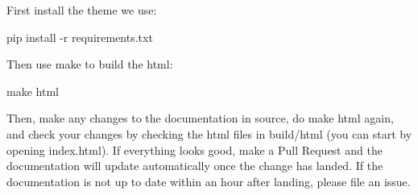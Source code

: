 First install the theme we use\+: 
\begin{DoxyCode}
pip install -r requirements.txt
\end{DoxyCode}


Then use make to build the html\+: 
\begin{DoxyCode}
make html
\end{DoxyCode}


Then, make any changes to the documentation in {\ttfamily source}, do {\ttfamily make html} again, and check your changes by checking the html files in {\ttfamily build/html} (you can start by opening {\ttfamily index.\+html}). If everything looks good, make a Pull Request and the documentation will update automatically once the change has landed. If the documentation is not up to date within an hour after landing, please file an issue. 